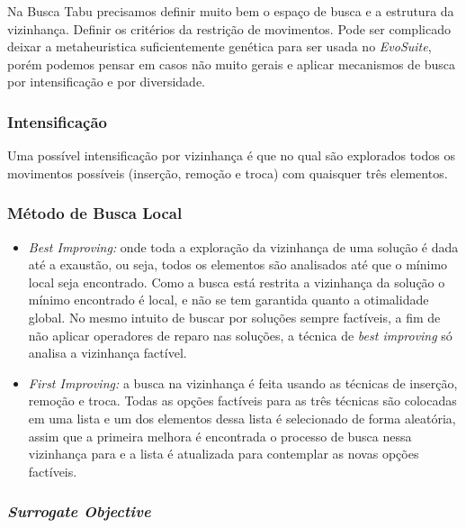 \documentclass[conference]{IEEEtran}
\begin{document}
    Na Busca Tabu precisamos definir muito bem o espaço de busca e a estrutura da vizinhança. Definir os critérios da restrição de movimentos. Pode ser complicado deixar a metaheuristica
    suficientemente genética para ser usada no \emph{EvoSuite}, porém podemos pensar em casos não muito gerais e aplicar mecanismos de busca por intensificação e por diversidade.


    \subsubsection{Intensificação}

        Uma possível intensificação por vizinhança é que no qual são explorados todos os movimentos possíveis (inserção, remoção e troca) com quaisquer três elementos. 

    \subsubsection{Método de Busca Local}

        \begin{itemize}

        \item {\it Best Improving:} onde toda a exploração da vizinhança de uma solução é dada até a exaustão, ou seja, todos os elementos são analisados até que o mínimo local seja encontrado. Como
            a busca está restrita a vizinhança da solução o mínimo encontrado é local, e não se tem garantida quanto a otimalidade global. No mesmo intuito de buscar por soluções sempre factíveis, a
                fim de não aplicar operadores de reparo nas soluções, a técnica de {\it best improving} só analisa a vizinhança factível. 

        \item {\it First Improving:} a busca na vizinhança é feita usando as técnicas de inserção, remoção e troca. Todas as opções factíveis para as três técnicas são colocadas em uma lista
        e um dos elementos dessa lista é selecionado de forma aleatória, assim que a primeira melhora é encontrada o processo de busca nessa vizinhança para e a lista é atualizada para
        contemplar as novas opções factíveis. 
        \end{itemize}

    \subsubsection{\it Surrogate Objective} 
\end{document}
